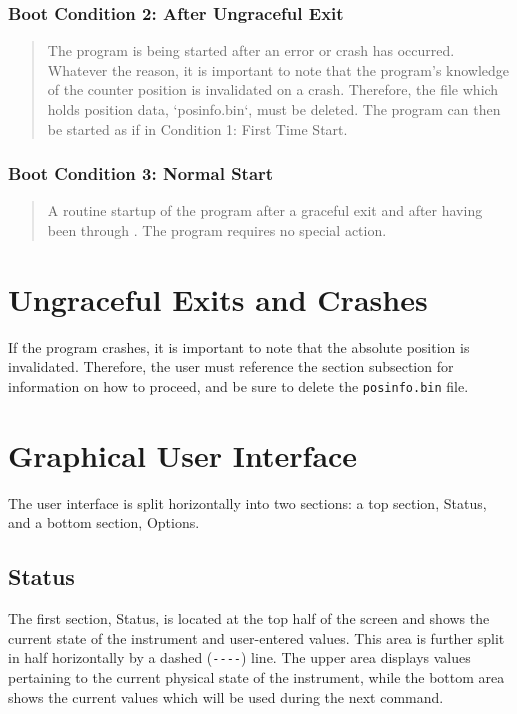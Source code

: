 \documentclass{article}
\begin{document}
\subsubsection{Boot Condition 2: After Ungraceful Exit} \label{subsubsection:bootcon2}
\begin{quote}
    The program is being started after an error or crash has occurred. Whatever the reason, it is important to note that the program’s knowledge of the counter position is invalidated on a crash. Therefore, the file which holds position data, `posinfo.bin`, must be deleted. The program can then be started as if in Condition 1: First Time Start.
\end{quote}

\subsubsection{Boot Condition 3: Normal Start} \label{subsubsection:bootcon3}
\begin{quote} 
    A routine startup of the program after a graceful exit and after having been through . The program requires no special action.
\end{quote}

\section{Ungraceful Exits and Crashes} \label{section:ungracefulexitsandcrashes}

If the program crashes, it is important to note that the absolute position is invalidated. Therefore, the user must reference the section  subsection  for information on how to proceed, and be sure to delete the \verb|posinfo.bin| file.

\section{Graphical User Interface} \label{section:interface}

The user interface is split horizontally into two sections: a top section, Status, and a bottom section, Options.

\subsection{Status} \label{subsection:status}

The first section, Status, is located at the top half of the screen and shows the current state of the instrument and user-entered values. This area is further split in half horizontally by a dashed (\verb|----|) line. The upper area displays values pertaining to the current physical state of the instrument, while the bottom area shows the current values which will be used during the next command.
\end{document}
